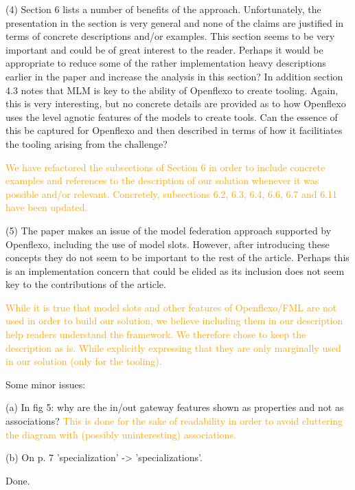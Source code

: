 \documentclass[10pt]{article}
\begin{document}
\begin{response}{(4) Section 6 lists a number of benefits of the approach. Unfortunately, the presentation in the section is very general and none of the claims are justified in terms of concrete descriptions and/or examples. This section seems to be very important and could be of great interest to the reader. Perhaps it would be appropriate to reduce some of the rather implementation heavy descriptions earlier in the paper and increase the analysis in this section? In addition section 4.3 notes that MLM is key to the ability of Openflexo to create tooling. Again, this is very interesting, but no concrete details are provided as to how Openflexo uses the level agnotic features of the models to create tools. Can the essence of this be captured for Openflexo and then described in terms of how it facilitiates the tooling arising from the challenge?}

\textcolor{orange}{We have refactored the subsections of Section 6 in order to include concrete examples and references to the description of our solution whenever it was possible and/or relevant. Concretely, subsections 6.2, 6.3, 6.4, 6.6, 6.7 and 6.11 have been updated.}


\end{response}

\begin{response}{(5) The paper makes an issue of the model federation approach supported by Openflexo, including the use of model slots. However, after introducing these concepts they do not seem to be important to the rest of the article. Perhaps this is an implementation concern that could be elided as its inclusion does not seem key to the contributions of the article. }

\textcolor{orange}{While it is true that model slots and other features of Openflexo/FML are not used in order to build our solution,  we believe including them in our description help readers understand the framework. We therefore chose to keep the description as is. While explicitly expressing that they are only marginally used in our solution (only for the tooling).}
\end{response}

\begin{response}{Some minor issues:

(a) In fig 5: why are the in/out gateway features shown as properties and not as associations? \textcolor{orange}{This is done for the sake of readability in order to avoid cluttering the diagram with (possibly uninteresting) associations.}

(b) On p. 7 'specialization' -> 'specializations'.}
Done.
\end{response}
\end{document}
